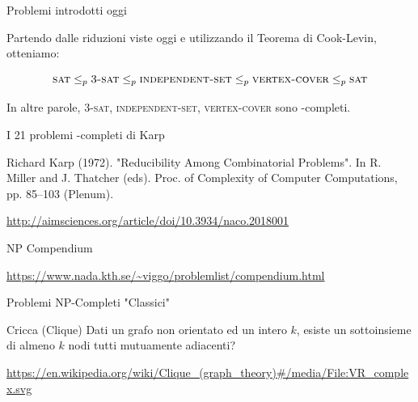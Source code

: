 \begin{frame}{Problemi introdotti oggi}

Partendo dalle riduzioni viste oggi e utilizzando il Teorema di Cook-Levin,
otteniamo:

\[
  \textsc{sat} \leq_p \textsc{3-sat} \leq_p \textsc{independent-set} \leq_p \textsc{vertex-cover} \leq_p \textsc{sat}
\]

\bigskip
In altre parole, \textsc{3-sat}, \textsc{independent-set}, \textsc{vertex-cover}
sono \NP-completi.

\end{frame}


\begin{frame}{I 21 problemi \NP-completi di Karp}

\vspace{-9pt}
\begin{block}{}
Richard Karp (1972). "Reducibility Among Combinatorial Problems". In R.  Miller and J. Thatcher (eds). Proc. of Complexity of Computer Computations, pp. 85–103 (Plenum).
\end{block}


\tiny
\url{http://aimsciences.org/article/doi/10.3934/naco.2018001}
\end{frame}

\begin{frame}{NP Compendium}

\vspace{-12pt}

\tiny
\url{https://www.nada.kth.se/\~viggo/problemlist/compendium.html}


\end{frame}


\begin{frame}{Problemi NP-Completi "Classici"}

\vspace{-9pt}
\begin{block}{Cricca (Clique)}
Dati un grafo non orientato ed un intero $k$, esiste un sottoinsieme di almeno
$k$ nodi tutti mutuamente adiacenti?
\end{block}


\vfill
\tiny
\url{https://en.wikipedia.org/wiki/Clique\_(graph_theory)\#/media/File:VR\_complex.svg}

\end{frame}


